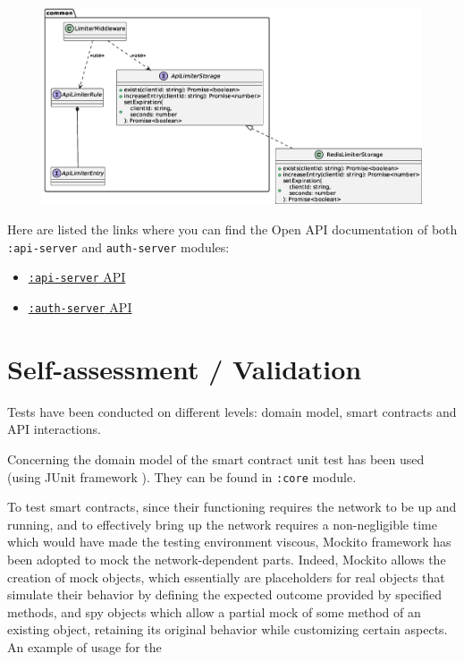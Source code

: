 \documentclass{scrartcl}
\begin{document}
\begin{figure}
    \centering
    \includegraphics[width=\linewidth]{figures/api-limiter-api.eps}
    \label{fig:api-limiter-api} 
\end{figure}

\begin{info}
    Here are listed the links where you can find the Open API documentation of both \texttt{:api-server} and \texttt{auth-server} modules:
    \begin{itemize}
        \item \href{https://tassiluca.github.io/ChainVote/swagger-ui-api/}{\texttt{:api-server} API}
        \item \href{https://tassiluca.github.io/ChainVote/swagger-ui-auth/}{\texttt{:auth-server} API}
    \end{itemize}
\end{info}

\fi

\section{Self-assessment / Validation}

\iffalse

Tests have been conducted on different levels: domain model, smart contracts and API interactions.

Concerning the domain model of the smart contract unit test has been used (using JUnit framework \cite{junit}).
%
They can be found in \texttt{:core} module.

To test smart contracts, since their functioning requires the network to be up and running, and to effectively bring up the network requires a non-negligible time which would have made the testing environment viscous, Mockito framework \cite{mockito} has been adopted to mock the network-dependent parts.
%
Indeed, Mockito allows the creation of mock objects, which essentially are placeholders for real objects that simulate their behavior by defining the expected outcome provided by specified methods, and spy objects which allow a partial mock of some method of an existing object, retaining its original behavior while customizing certain aspects.
%
An example of usage for the 
\end{document}
